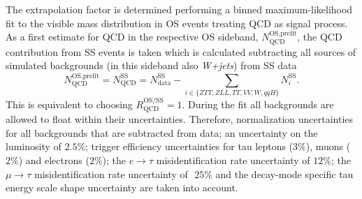 The extrapolation factor is determined performing a binned maximum-likelihood fit to the visible mass distribution in OS events treating QCD as signal process. 
As a first estimate for QCD in the respective OS sideband, $N_\text{QCD}^\text{OS,prefit}$, the QCD contribution from SS events is taken which is calculated subtracting all sources of simulated backgrounds (in this sideband also \textit{W+jets}) from SS data
\begin{equation}
    N_\text{QCD}^\text{OS,prefit} = N_\text{QCD}^\text{SS} = N_\text{data}^\text{SS} - \sum_{i \in \{ZTT,ZLL,TT,VV,W,qqH \}} N_{i}^\text{SS}.
\end{equation}
This is equivalent to choosing $R_\text{QCD}^\text{OS/SS} = 1$. During the fit all backgrounds are allowed to float within their uncertainties. Therefore, normalization 
uncertainties for all backgrounds that are subtracted from data; an uncertainty on the luminosity 
of $\text{2.5\%}$; trigger efficiency uncertainties for tau leptons ($\text{3\%}$), muons ($\text{2\%}$) and 
electrons ($\text{2\%}$); the $e\rightarrow \tau$ misidentification rate uncertainty of $\text{12\%}$; the $\mathsf{\mu \rightarrow \tau}$
misidentification rate uncertainty of $\text{ 25\%}$ and the decay-mode specific tau energy scale shape uncertainty are taken into account.

